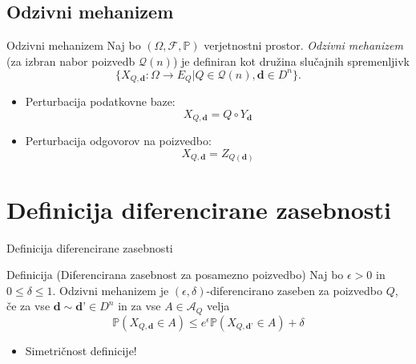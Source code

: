 \documentclass{beamer}
\begin{document}
\subsection{Odzivni mehanizem}

\begin{frame}{Odzivni mehanizem}
Naj bo $(\Omega , \mathcal{F}, \mathbb {P} )$ verjetnostni prostor. \textit{Odzivni mehanizem} (za izbran nabor poizvedb $\mathcal{Q}(n)$) je definiran kot družina slučajnih spremenljivk
\begin{equation}\label{odzivni}
 \{X_{Q,\textbf{d}} : \Omega \rightarrow  E_{Q} | Q \in  \mathcal{Q} (n), \textbf{d} \in D^n\} \tag{1}.
\end{equation} 
\begin{itemize}
\item Perturbacija podatkovne baze: 
\begin{equation}\label{odzivni2}
 X_{Q,\textbf{d}} = Q \circ Y_{\textbf{d}} \tag{2}
\end{equation} 
\item Perturbacija odgovorov na poizvedbo:
\begin{equation}\label{odzivni3}
X_{Q,\textbf{d}}=Z_{Q(\textbf{d})}\tag{3}
\end{equation} 
\end{itemize}
\end{frame}

\section{Definicija diferencirane zasebnosti}

\begin{frame}{Definicija diferencirane zasebnosti}
\begin{block}{Definicija (Diferencirana zasebnost za posamezno poizvedbo)}
Naj bo $\epsilon > 0$ in $0 \leq \delta \leq 1 $. Odzivni mehanizem je $(\epsilon, \delta)$-diferencirano zaseben za poizvedbo $Q$, če za vse $\textbf{d} \sim \textbf{d'} \in D^n$  in za vse $A\in\mathcal{A}_{Q}$ velja 
\begin{equation}\label{diferen}
\mathbb{P}(X_{Q,\textbf{d}} \in A) \leq e^\epsilon \mathbb{P}(X_{Q,\textbf{d'}} \in A) + \delta \tag{4}
\end{equation}
\end{block}
\begin{itemize}
\item Simetričnost definicije!
\end{itemize}
\end{frame}
\end{document}
